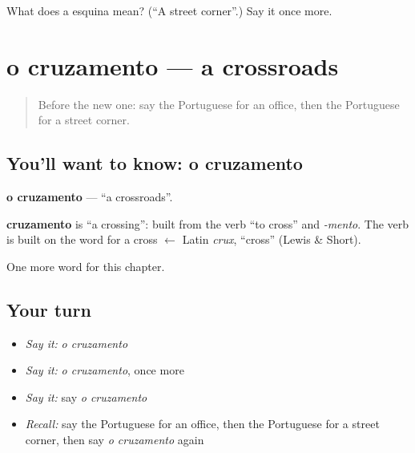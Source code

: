 \begin{tcolorbox}[breakable,colback=teal!4,colframe=teal!35!black,title={Before you move on}]
What does a esquina mean? (\textquotedblleft{}A street corner\textquotedblright{}.) Say it once more.
\end{tcolorbox}
\section[o cruzamento]{o cruzamento — a crossroads}

\label{lesson:PT-C87-cruzamento}



\begin{quote}
Before the new one: say the Portuguese for an office, then the Portuguese for a street corner.
\end{quote}

\subsection*{You'll want to know: o cruzamento}
\textbf{o cruzamento} — \textquotedblleft{}a crossroads\textquotedblright{}.

\begin{cousinweb}
\textbf{cruzamento} is \textquotedblleft{}a crossing\textquotedblright{}: built from the verb \textquotedblleft{}to cross\textquotedblright{} and \emph{-mento}. The verb is built on the word for a cross $\leftarrow$ Latin \emph{crux}, \textquotedblleft{}cross\textquotedblright{} (Lewis \& Short).
\end{cousinweb}

\begin{grammarlens}[title={What you've built}]
One more word for this chapter.
\end{grammarlens}

\subsection*{Your turn}
\begin{itemize}
\raggedright
  \item \emph{Say it:} \emph{o cruzamento}
  \item \emph{Say it:} \emph{o cruzamento}, once more
  \item \emph{Say it:} say \emph{o cruzamento}
  \item \emph{Recall:} say the Portuguese for an office, then the Portuguese for a street corner, then say \emph{o cruzamento} again
\end{itemize}

